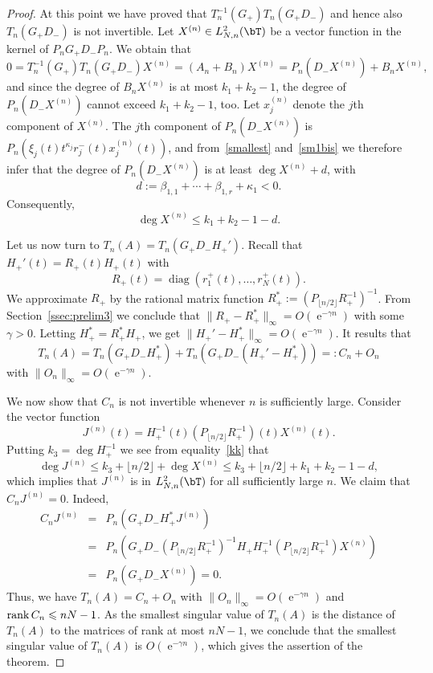 \documentclass[addpoints,12pt,letter]{article}
\DeclareMathOperator{\diag}{diag}
\DeclareMathOperator{\e}{e}
\newcommand{\be}{\beta}
\newcommand{\ga}{\gamma}
\newcommand{\ka}{\kappa}
\newcommand{\nf}{\infty}
\renewcommand{\le}{\leqslant}
\numberwithin{equation}{section}
\theoremstyle{definition}
\begin{document}
\begin{proof}
At this point we have proved that $T_{n}^{-1}(G_{+})T_{n}(G_{+}D_{-})$ and hence also $T_{n}(G_{+}D_{-})$ is not invertible.
Let $X^{(n)}\in L^{2}_{N,n}(\bT)$ be a vector function in the kernel of $P_{n}G_{+}D_{-}P_{n}$.
We obtain that
\[
0=T_{n}^{-1}(G_{+})T_{n}(G_{+}D_{-})X^{(n)}=(A_{n}+B_{n})X^{(n)}=P_{n}(D_{-}X^{(n)})+B_{n}X^{(n)},
\]
and since the degree of $B_{n}X^{(n)}$ is at most $k_{1}+k_{2}-1$, the degree of $P_{n}(D_{-}X^{(n)})$ cannot exceed $k_{1}+k_{2}-1$, too.
Let $x_{j}^{(n)}$ denote the $j$th component of $X^{(n)}$.
The $j$th component of $P_{n}(D_{-}X^{(n)})$ is $P_{n}(\xi_{j}(t)t^{\ka_{j}}r_{j}^{-}(t) x_{j}^{(n)}(t))$, and from~\eqref{smallest} and~\eqref{sm1bis} we therefore infer that the degree of $P_{n}(D_{-}X^{(n)})$ is at least $\deg X^{(n)}+d$, with
\begin{equation*}
d:=\be_{1,1}+\cdots+\be_{1,r}+\ka_{1}<0.
\end{equation*}
Consequently,
\begin{equation}\label{kk}
\deg X^{(n)}\le k_{1}+k_{2}-1-d.
\end{equation}

Let us now turn to $T_{n}(A)=T_{n}(G_{+}D_{-}H_{+}')$.
Recall that $H_{+}'(t)=R_{+}(t)H_{+}(t)$ with
\[
R_{+}(t)=\diag (r_{1}^{+}(t), \ldots,r_N^{+}(t)).
\]
We approximate $R_{+}$ by the rational matrix function $R_{+}^{\ast}:=(P_{\lfloor n/2 \rfloor} R_{+}^{-1})^{-1}$.
From Section~\ref{ssec:prelim3} we conclude that $\|R_{+}-R_{+}^{\ast}\|_{\nf}=O(\e^{-\ga n})$ with some $\ga>0$.
Letting $H_{+}^{\ast}=R_{+}^{\ast}H_{+}$, we get $\|H_{+}'-H_{+}^{\ast}\|_{\nf}=O(\e^{-\ga n})$.
It results that
\[
T_{n}(A)=T_{n}(G_{+}D_{-}H_{+}^{\ast})+T_{n}(G_{+}D_{-}(H_{+}'-H_{+}^*))=:C_{n}+O_{n}
\]
with $\|O_n\|_{\nf}=O(\e^{-\ga n})$.

We now show that $C_{n}$ is not invertible whenever $n$ is sufficiently large.
Consider the vector function
\[
J^{(n)}(t)=H_{+}^{-1}(t)(P_{\lfloor n/2 \rfloor} R_{+}^{-1})(t)X^{(n)}(t).
\]
Putting $k_{3}=\deg H_{+}^{-1}$ we see from equality~\eqref{kk} that
\[
\deg J^{(n)}\le k_{3}+\lfloor n/2 \rfloor+\deg X^{(n)}\le k_{3}+\lfloor n/2 \rfloor+k_{1}+k_{2}-1-d,
\]
which implies that $J^{(n)}$ is in $L^{2}_{N,n}(\bT)$ for all sufficiently large $n$.
We claim that $C_{n}J^{(n)}=0$.
Indeed,
\begin{eqnarray*}
C_{n}J^{(n)} &=& P_{n}(G_{+}D_{-}H_{+}^{\ast}J^{(n)})\\
&=& P_{n}(G_{+}D_{-}(P_{\lfloor n/2 \rfloor} R_{+}^{-1})^{-1} H_{+}H_{+}^{-1}(P_{\lfloor n/2 \rfloor} R_{+}^{-1}) X^{(n)})\\
&=& P_{n}(G_{+}D_{-}X^{(n)})=0.
\end{eqnarray*}
Thus, we have $T_{n}(A)=C_{n}+O_{n}$ with $\|O_{n}\|_{\nf}=O(\e^{-\ga n})$ and ${\rm rank}\,C_{n}\le nN-1$.
As the smallest singular value of $T_{n}(A)$ is the distance of $T_{n}(A)$ to the matrices of rank at most $nN-1$, we conclude that the smallest singular value of $T_{n}(A)$ is $O(\e^{-\ga n})$, which gives the assertion of the theorem.
\end{proof}
\end{document}
